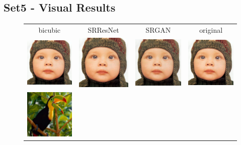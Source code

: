 \documentclass[10pt,twocolumn,letterpaper]{article}
\begin{document}
\subsection{Set5 - Visual Results}
\label{app:Set5}
\begin{figure}[h!]
  	\begin{tabular}{cccc}
  		 bicubic & SRResNet & SRGAN & original \\
     	\includegraphics[width=1.4in]{images/used/appendix/jpg/Set5/baby_bicubic}&
     	\includegraphics[width=1.4in]{images/used/appendix/jpg/Set5/baby_SRResNet-MSE} &
     	\includegraphics[width=1.4in]{images/used/appendix/jpg/Set5/baby_SRGAN-VGG54} &
     	\includegraphics[width=1.4in]{images/used/appendix/jpg/Set5/baby_HR} \\
     	\includegraphics[width=1.4in]{images/used/appendix/jpg/Set5/bird_bicubic}&

\end{tabular}
\end{figure}
\end{document}
